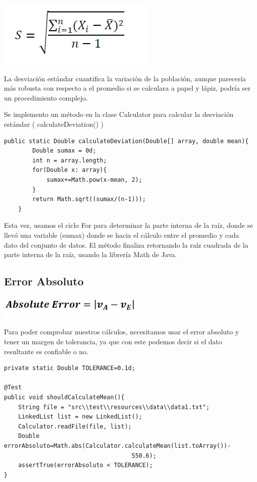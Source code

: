 \documentclass[
	12pt, %
	spanish, %
]{fphw}
\begin{document}
\includegraphics[scale=0.8]{2583684_orig.jpg}

La desviación estándar cuantifica la variación de la población, aunque parecería más robusta con respecto a el promedio si se calculara a papel y lápiz, podría ser un procedimiento complejo.

Se implemento un método en la clase Calculator para calcular la desviación estándar ( calculateDeviation() ) 

\begin{verbatim}
public static Double calculateDeviation(Double[] array, double mean){
        Double sumax = 0d;
        int n = array.length;
        for(Double x: array){
            sumax+=Math.pow(x-mean, 2);
        }
        return Math.sqrt((sumax/(n-1)));
    }
\end{verbatim}

Esta vez, usamos el ciclo For para determinar la parte interna de la raíz, donde se llevó una variable (sumax) donde se hacia el cálculo entre el promedio y cada dato del conjunto de datos. El método finaliza retornando la raíz cuadrada de la parte interna de la raíz, usando la librería Math de Java.



\subsection*{Error Absoluto} 

\includegraphics[scale=0.8]{Capture.JPG}


Para poder comprobar nuestros cálculos, necesitamos usar el error absoluto y tener un margen de tolerancia, ya que con este podemos decir si el dato resultante es confiable o no.

\begin{verbatim}
private static Double TOLERANCE=0.1d;

@Test
public void shouldCalculateMean(){
    String file = "src\\test\\resources\\data\\data1.txt";
    LinkedList list = new LinkedList();
    Calculator.readFile(file, list);
    Double errorAbsoluto=Math.abs(Calculator.calculateMean(list.toArray())-
                                    550.6);
    assertTrue(errorAbsoluto < TOLERANCE);
}
\end{verbatim}
\end{document}
